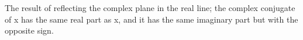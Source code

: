 The result of reflecting the complex plane in the real
line; the complex conjugate of x has the same real
part as x, and it has the same imaginary part but with 
the opposite sign.